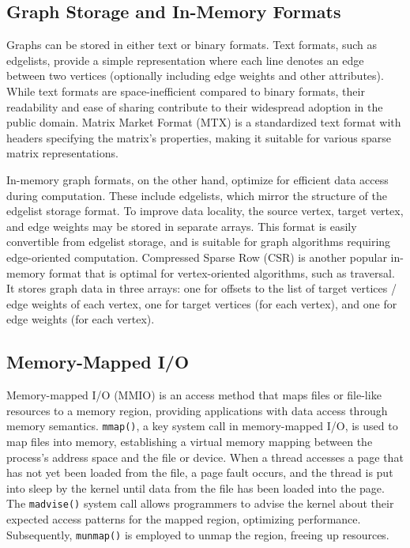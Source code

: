 \subsection{Graph Storage and In-Memory Formats}

Graphs can be stored in either text or binary formats. Text formats, such as edgelists, provide a simple representation where each line denotes an edge between two vertices (optionally including edge weights and other attributes). While text formats are space-inefficient compared to binary formats, their readability and ease of sharing contribute to their widespread adoption in the public domain. Matrix Market Format (MTX) is a standardized text format with headers specifying the matrix's properties, making it suitable for various sparse matrix representations.

In-memory graph formats, on the other hand, optimize for efficient data access during computation. These include edgelists, which mirror the structure of the edgelist storage format. To improve data locality, the source vertex, target vertex, and edge weights may be stored in separate arrays. This format is easily convertible from edgelist storage, and is suitable for graph algorithms requiring edge-oriented computation. Compressed Sparse Row (CSR) is another popular in-memory format that is optimal for vertex-oriented algorithms, such as traversal. It stores graph data in three arrays: one for offsets to the list of target vertices / edge weights of each vertex, one for target vertices (for each vertex), and one for edge weights (for each vertex).




\subsection{Memory-Mapped I/O}

Memory-mapped I/O (MMIO) is an access method that maps files or file-like resources to a memory region, providing applications with data access through memory semantics. \texttt{mmap()}, a key system call in memory-mapped I/O, is used to map files into memory, establishing a virtual memory mapping between the process's address space and the file or device. When a thread accesses a page that has not yet been loaded from the file, a page fault occurs, and the thread is put into sleep by the kernel until data from the file has been loaded into the page. The \texttt{madvise()} system call allows programmers to advise the kernel about their expected access patterns for the mapped region, optimizing performance. Subsequently, \texttt{munmap()} is employed to unmap the region, freeing up resources.

